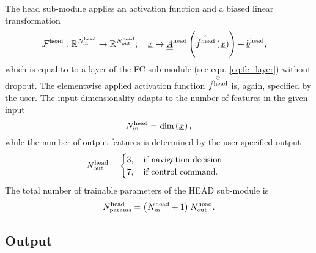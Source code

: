 The head sub-module applies 
an activation function 
and a biased linear transformation
\begin{align} \label{eq:head}
    \mathcal{F}^\head
    :\ &
    \mathbb{R}^{ \num[]{\head}{\inp}{}{} }
    \rightarrow 
    \mathbb{R}^{ \num[]{\head}{\outp}{}{} }
    ;\quad 
    \featvec[]{}{}{}{}
    \mapsto
    \underline{\underline A}^\head
    \left(
        \overset{\scriptscriptstyle \odot}{\func[\user]{\head}{}{}{}}
        \left(\featvec[]{}{}{}{}\right)
    \right)
    + \underline b^\head
    ,
\end{align}
which is equal to to a layer of the FC sub-module
(see equ. \ref{eq:fc_layer}) without dropout.
The elementwise applied activation function
$\overset{\scriptscriptstyle \odot}{\func[\user]{\head}{}{}{}}$ 
is, again, specified by the user.
The input dimensionality adapts to the
number of features in the given input
\begin{equation}
    \num[]{\head}{\inp}{}{}
    =
    \dim \left(\featvec[]{}{}{}{}\right),
\end{equation}
while the number of output features is determined by the user-specified output
\begin{equation}
    \num[]{\head}{\outp}{}{}
    = 
    \begin{cases}
        3
        ,\quad 
        \text{if navigation decision} 
        \\
        7
        ,\quad 
        \text{if control command.} 
    \end{cases}
\end{equation}
The total number of trainable parameters of the HEAD sub-module is
\begin{equation}
    \num[]{\head}{\params}{}{}
    = 
    \left( \num[]{\head}{\inp}{}{} + 1 \right)
    \num[]{\head}{\outp}{}{}
    .
\end{equation}






%
\subsection*{Output}










